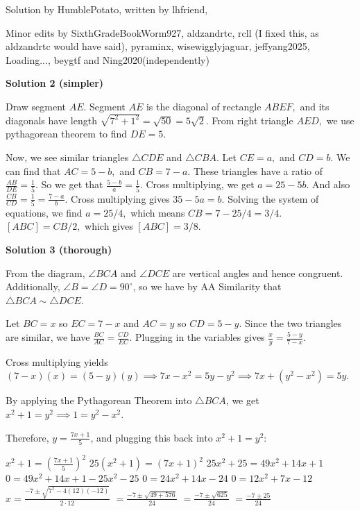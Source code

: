 \begin{enumerate}
 Solution by HumblePotato, written by lhfriend, 

 Minor edits by SixthGradeBookWorm927, aldzandrtc, rcll (I fixed this, as aldzandrtc would have said), pyraminx, wisewigglyjaguar, jeffyang2025, Loading..., beygtf and Ning2020(independently)

 



\textbf{Solution 2 (simpler)}

Draw segment $AE.$ Segment $AE$ is the diagonal of rectangle $ABEF,$ and its diagonals have length $\sqrt{7^2+1^2}=\sqrt{50}=5\sqrt2.$ From right triangle $AED,$ we use pythagorean theorem to find $DE = 5.$

 Now, we see similar triangles $\triangle CDE$ and $\triangle CBA$. Let $CE = a,$ and $CD = b.$ We can find that $AC = 5-b,$ and $CB = 7-a.$ These triangles have a ratio of $\frac {AB}{DE} = \frac{1}{5}.$ So we get that $\frac {5-b}{a} = \frac{1}{5}.$ Cross multiplying, we get $a =25-5b.$ And also $\frac{CB}{CD} = \frac{1}{5} = \frac{7-a}{b}.$ Cross multiplying gives $35-5a=b.$ Solving the system of equations, we find $a = 25/4,$ which means $CB = 7-25/4 = 3/4.$ $[ABC] = CB/2,$ which gives $\boxed{[ABC] = 3/8}.$




\textbf{Solution 3 (thorough)}

From the diagram, $\angle BCA$ and $\angle DCE$ are vertical angles and hence congruent. Additionally, $\angle B = \angle D = 90^\circ$, so we have by AA Similarity that $\triangle BCA \sim \triangle DCE$.  

 Let $BC = x$ so $EC = 7 - x$ and $AC = y$ so $CD = 5 - y$. Since the two triangles are similar, we have $\frac{BC}{AC} = \frac{CD}{EC}$. Plugging in the variables gives $\frac{x}{y} = \frac{5 - y}{7 - x}$.  

 Cross multiplying yields $(7 - x)(x) = (5 - y)(y) \implies 7x - x^2 = 5y - y^2 \implies 7x + (y^2 - x^2) = 5y$.  

 By applying the Pythagorean Theorem into $\triangle BCA$, we get $x^2 + 1 = y^2 \implies 1 = y^2 - x^2$.  

 Therefore, $y = \frac{7x + 1}{5}$, and plugging this back into $x^2 + 1 = y^2$:

 $x^2 + 1= (\frac{7x+1}{5})^2$
$25(x^2 + 1) = (7x+1)^2$
$25x^2 + 25 = 49x^2 + 14x + 1$
$0 = 49x^2 + 14x + 1 - 25x^2 - 25$
$0 = 24x^2 + 14x - 24$
$0 = 12x^2 + 7x - 12$
$x = \frac{-7 \pm \sqrt{7^2 - 4(12)(-12)}}{2\cdot 12}$
$= \frac{-7 \pm \sqrt{49 + 576}}{24}$
$= \frac{-7 \pm \sqrt{625}}{24}$
$= \frac{-7 \pm 25}{24}$


\end{enumerate}
